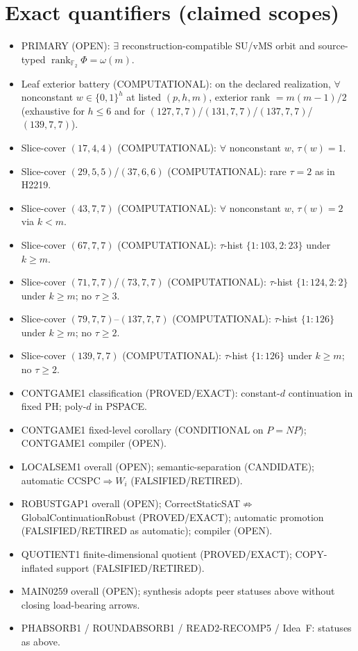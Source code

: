 \documentclass[11pt]{article}
\begin{document}
\section*{Exact quantifiers (claimed scopes)}
\begin{itemize}
\item PRIMARY (OPEN): $\exists$ reconstruction-compatible SU/vMS orbit and source-typed
  $\operatorname{rank}_{\mathbb F_2}\Phi=\omega(m)$.
\item Leaf exterior battery (COMPUTATIONAL): on the declared realization, $\forall$ nonconstant
  $w\in\{0,1\}^h$ at listed $(p,h,m)$, exterior rank $=m(m-1)/2$
  (exhaustive for $h\le6$ and for $(127,7,7)$/$(131,7,7)$/$(137,7,7)$/$(139,7,7)$).
\item Slice-cover $(17,4,4)$ (COMPUTATIONAL): $\forall$ nonconstant $w$, $\tau(w)=1$.
\item Slice-cover $(29,5,5)$/$(37,6,6)$ (COMPUTATIONAL): rare $\tau{=}2$ as in H2219.
\item Slice-cover $(43,7,7)$ (COMPUTATIONAL): $\forall$ nonconstant $w$, $\tau(w)=2$ via $k{<}m$.
\item Slice-cover $(67,7,7)$ (COMPUTATIONAL): $\tau$-hist $\{1{:}103,2{:}23\}$ under $k{\ge}m$.
\item Slice-cover $(71,7,7)$/$(73,7,7)$ (COMPUTATIONAL): $\tau$-hist $\{1{:}124,2{:}2\}$ under $k{\ge}m$;
  no $\tau{\ge}3$.
\item Slice-cover $(79,7,7)$--$(137,7,7)$ (COMPUTATIONAL): $\tau$-hist $\{1{:}126\}$ under $k{\ge}m$;
  no $\tau{\ge}2$.
\item Slice-cover $(139,7,7)$ (COMPUTATIONAL): $\tau$-hist $\{1{:}126\}$ under $k{\ge}m$;
  no $\tau{\ge}2$.
\item CONTGAME1 classification (PROVED/EXACT): constant-$d$ continuation in fixed PH;
  poly-$d$ in PSPACE.
\item CONTGAME1 fixed-level corollary (CONDITIONAL on $P=NP$); CONTGAME1 compiler (OPEN).
\item LOCALSEM1 overall (OPEN); semantic-separation (CANDIDATE); automatic CCSPC$\Rightarrow W_i$ (FALSIFIED/RETIRED).
\item ROBUSTGAP1 overall (OPEN); CorrectStaticSAT$\not\Rightarrow$GlobalContinuationRobust (PROVED/EXACT);
  automatic promotion (FALSIFIED/RETIRED as automatic); compiler (OPEN).
\item QUOTIENT1 finite-dimensional quotient (PROVED/EXACT); COPY-inflated support (FALSIFIED/RETIRED).
\item MAIN0259 overall (OPEN); synthesis adopts peer statuses above without closing load-bearing arrows.
\item PHABSORB1 / ROUNDABSORB1 / READ2-RECOMP5 / Idea~F: statuses as above.
\end{itemize}
\end{document}
